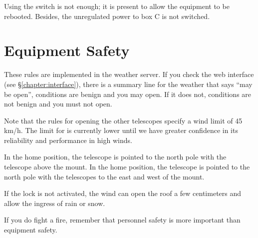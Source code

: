 Using the switch is not enough; it is present to allow the equipment to be rebooted. Besides, the unregulated power to box C is not switched.



\section{Equipment Safety}


These rules are implemented in the {\projectname} weather server. If you check the {\projectname} web interface (see \S\ref{chapter:interface}), there is a summary line for the weather that says “may be open”, conditions are benign and you may open. If it does not, conditions are not benign and you must not open.

Note that the rules for opening the other telescopes specify a wind limit of 45 km/h. The limit for {\projectname} is currently lower until we have greater confidence in its reliability and performance in high winds.


\ifcoatli
In the home position, the telescope is pointed to the north pole with the telescope above the mount.
\fi
\ifddoti
In the home position, the telescope is pointed to the north pole with the telescopes to the east and west of the mount.
\fi



If the lock is not activated, the wind can open the roof a few centimeters and allow the ingress of rain or snow.


If you do fight a fire, remember that personnel safety is more important than equipment safety.


